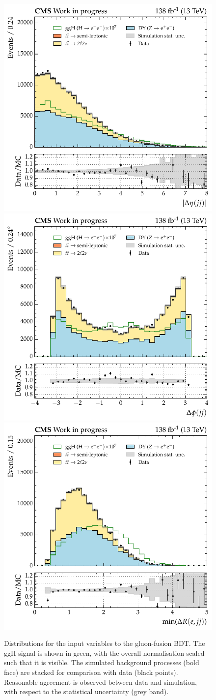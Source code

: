 \begin{figure}[htbp!]
\includegraphics[width =0.33\linewidth]{Figures/Hee/ggH/dataMC/all_inputs/ggH_BDT_pt_reweighted_dijetAbsDEta.pdf}\hfill%
\includegraphics[width =0.33\linewidth]{Figures/Hee/ggH/dataMC/all_inputs/ggH_BDT_pt_reweighted_dijetDPhi.pdf}\hfill%
\includegraphics[width =0.33\linewidth]{Figures/Hee/ggH/dataMC/all_inputs/ggH_BDT_pt_reweighted_dijetMinDRJetEle.pdf}\hfill%
 
\caption{Distributions for the input variables to the gluon-fusion BDT. The ggH signal is shown in green, with the overall normalisation scaled such that it is visible. The simulated background processes (bold face) are stacked for comparison with data (black points). Reasonable agreement is observed between data and simulation, with respect to the statistical uncertainty (grey band).}
\label{fig:ggH_inputs_first}
\end{figure}
 
